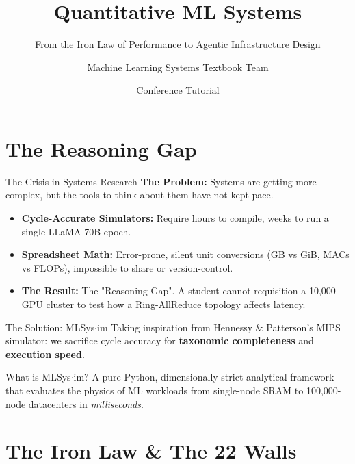 \documentclass[aspectratio=169, 10pt]{beamer}
\title{Quantitative ML Systems}
\subtitle{From the Iron Law of Performance to Agentic Infrastructure Design}
\author{Machine Learning Systems Textbook Team}
\date{Conference Tutorial}
\begin{document}
\maketitle

\section{The Reasoning Gap}

\begin{frame}{The Crisis in Systems Research}
    \textbf{The Problem:} Systems are getting more complex, but the tools to think about them have not kept pace.
    \vspace{0.5cm}
    
    \begin{itemize}
        \item \textbf{Cycle-Accurate Simulators:} Require hours to compile, weeks to run a single LLaMA-70B epoch.
        \item \textbf{Spreadsheet Math:} Error-prone, silent unit conversions (GB vs GiB, MACs vs FLOPs), impossible to share or version-control.
        \item \textbf{The Result:} The "Reasoning Gap". A student cannot requisition a 10,000-GPU cluster to test how a Ring-AllReduce topology affects latency.
    \end{itemize}
\end{frame}

\begin{frame}{The Solution: MLSys$\cdot$im}
    Taking inspiration from Hennessy \& Patterson's MIPS simulator: we sacrifice cycle accuracy for \textbf{taxonomic completeness} and \textbf{execution speed}.
    \vspace{0.5cm}
    
    \begin{block}{What is MLSys$\cdot$im?}
        A pure-Python, dimensionally-strict analytical framework that evaluates the physics of ML workloads from single-node SRAM to 100,000-node datacenters in \emph{milliseconds}.
    \end{block}
\end{frame}

\section{The Iron Law \& The 22 Walls}
\end{document}
